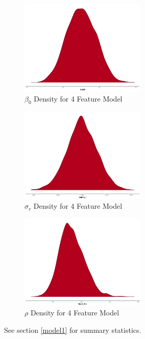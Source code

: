 \documentclass[11pt]{article}
\begin{document}
\begin{figure}[h!] 
	\centering
  \includegraphics[height=45mm]{density_beta0.png}
  \caption{$\beta_0$ Density for 4 Feature Model}
  \label{fig:dbeta0}
\end{figure}

\begin{figure}[h!] 
	\centering
  \includegraphics[height=45mm]{density_sigma_r.png}
  \caption{$\sigma_r$ Density for 4 Feature Model}
  \label{fig:dsigma_r}
\end{figure}

\begin{figure}[h!] 
	\centering
  \includegraphics[height=45mm]{density_logit_rho.png}
  \caption{$\rho$ Density for 4 Feature Model}
  \label{fig:dlogit_rho}
\end{figure}









\FloatBarrier

See section \ref{model1} for summary statistics.

\newpage
\end{document}
